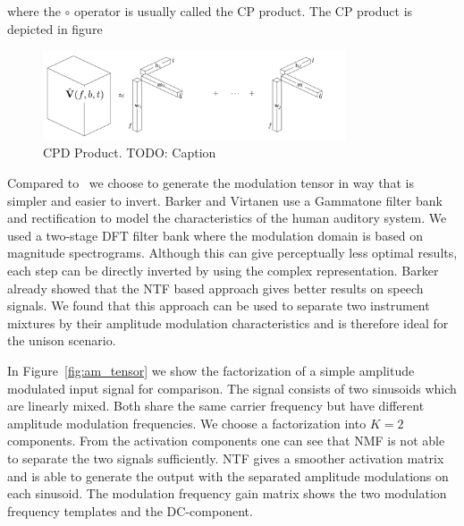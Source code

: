 where the \(\circ\) operator is usually called the CP product.
The CP product is depicted in figure

\begin{figure}
  \centering
  \includegraphics[width=0.8\textwidth]{Chapters/06_Separation_Unknown/figures/cpd.pdf}
  \caption{CPD Product. TODO: Caption}
  \label{fig:cpd}
\end{figure}
\par
Compared to~\cite{barker13} we choose to generate the modulation tensor in way that is simpler and easier to invert. Barker and Virtanen use a Gammatone filter bank and  rectification to model the characteristics of the human auditory system. We used a two-stage DFT filter bank where the modulation domain is based on  magnitude spectrograms. Although this can give perceptually less optimal results, each step can be directly inverted by using the complex representation. Barker already showed that the NTF based approach gives better results on speech signals. We found that this approach can be used to separate two instrument mixtures by their amplitude modulation characteristics and is therefore ideal for the unison scenario.

In Figure~\ref{fig:am_tensor} we show the factorization of a simple amplitude modulated input signal for comparison. The signal consists of two sinusoids which are linearly mixed. Both share the same carrier frequency but have different amplitude modulation frequencies. We choose a factorization into $K=2$ components. From the activation components one can see that NMF is not able to separate the two signals sufficiently. NTF gives a smoother activation matrix and is able to generate the output with the separated amplitude modulations on each sinusoid. The modulation frequency gain matrix shows the two modulation frequency templates and the DC-component.


